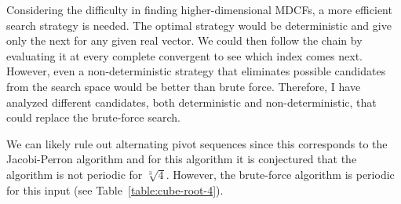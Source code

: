 Considering the difficulty in finding higher-dimensional MDCFs,
a more efficient search strategy is needed.
The optimal strategy would be deterministic
and give only the next for any given real vector.
We could then follow the chain by evaluating it at every complete convergent to
see which index comes next.
However, even a non-deterministic strategy that eliminates possible candidates
from the search space would be better than brute force.
Therefore, I have analyzed different candidates, both deterministic and
non-deterministic, that could replace the brute-force search.

We can likely rule out alternating pivot sequences since this corresponds to
the Jacobi-Perron algorithm and for this algorithm it is conjectured
\cite{Karpenkov21} that the algorithm is not periodic for $\sqrt[3]{4}$.
However, the brute-force algorithm is periodic for this input (see Table~\ref{table:cube-root-4}).
